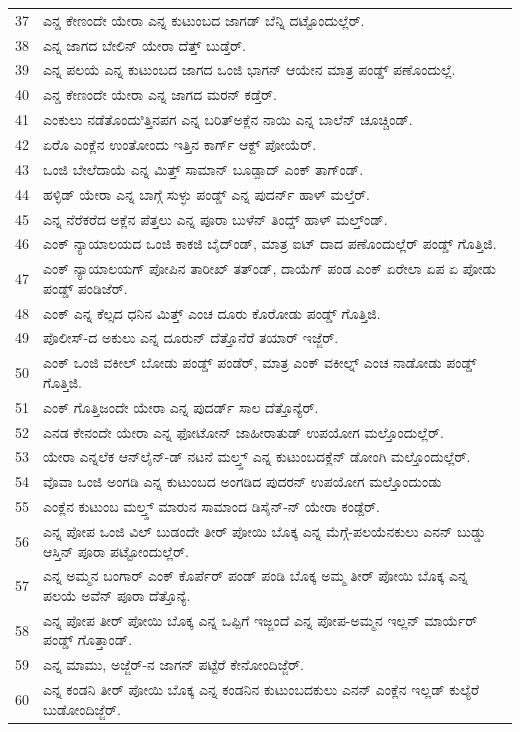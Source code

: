 \documentclass[11pt]{article}
\begin{document}
\begin{longtable}{p{} >{\kannadafont}p{}}
37 & ಎನ್ಡ ಕೇಣಂದೇ ಯೇರಾ ಎನ್ನ ಕುಟುಂಬದ ಜಾಗಡ್ ಬೆನ್ನಿ ದಟ್ಟೊಂದುಲ್ಲೆರ್. \\
38 & ಎನ್ನ ಜಾಗದ ಬೇಲಿನ್ ಯೇರಾ ದೆತ್ತ್ ಬುಡ್ತೆರ್. \\
39 & ಎನ್ನ ಪಲಯೆ ಎನ್ನ ಕುಟುಂಬದ ಜಾಗದ ಒಂಜಿ ಭಾಗನ್ ಆಯೇನ ಮಾತ್ರ ಪಂಡ್ಡ್ ಪಣೊಂದುಲ್ಲೆ. \\
40 & ಎನ್ಡ ಕೇಣಂದೇ ಯೇರಾ ಎನ್ನ ಜಾಗದ ಮರನ್ ಕಡ್ತೆರ್. \\
41 & ಎಂಕುಲು ನಡೆತೊಂದುಿತ್ತಿನಪಗ ಎನ್ನ ಬರಿತ್ಅಕ್ಲೆನ ನಾಯಿ ಎನ್ನ ಬಾಲೆನ್ ಚೂಚ್ಚಿಂಡ್. \\
42 & ಏರೊ ಎಂಕ್ಲೆನ ಉಂತೋಂದು ಇತ್ತಿನ ಕಾರ್ಗ್ ಆಕ್ದ್ ಪೋಯೆರ್. \\
43 & ಒಂಜಿ ಬೇಲೆದಾಯೆ ಎನ್ನ ಮಿತ್ತ್ ಸಾಮಾನ್ ಬೂಡ್ಪಾದ್ ಎಂಕ್ ತಾಗ್ಂಡ್. \\
44 & ಹಳ್ಳಿಡ್ ಯೇರಾ ಎನ್ನ ಬಾಗ್ಗೆ ಸುಳ್ಳು ಪಂಡ್ಡ್ ಎನ್ನ ಪುದರ್ನ್ ಹಾಳ್ ಮಲ್ತೆರ್. \\
45 & ಎನ್ನ ನೆರೆಕರೆದ ಅಕ್ಲೆನ ಪೆತ್ತಲು ಎನ್ನ ಪೂರಾ ಬುಳೆನ್ ತಿಂದ್ಡ್ ಹಾಳ್ ಮಲ್ತ್ಂಡ್. \\
46 & ಎಂಕ್ ನ್ಯಾಯಾಲಯದ ಒಂಜಿ ಕಾಕಜಿ ಬೈದ್ಂಡ್, ಮಾತ್ರ ಐಟ್ ದಾದ ಪಣೊಂದುಲ್ಲೆರ್ ಪಂಡ್ಡ್ ಗೊತ್ತಿಜಿ. \\
47 & ಎಂಕ್ ನ್ಯಾಯಾಲಯಗ್ ಪೋಪಿನ ತಾರೀಖ್ ತತ್ಂಡ್, ದಾಯೆಗ್ ಪಂಡ ಎಂಕ್ ಏರೇಲಾ ಏಪ ಏ ಪೋಡು ಪಂಡ್ಡ್ ಪಂಡಿಜೆರ್. \\
48 & ಎಂಕ್ ಎನ್ನ ಕೆಲ್ಸದ ಧನಿನ ಮಿತ್ತ್ ಎಂಚ ದೂರು ಕೊರೋಡು ಪಂಡ್ಡ್ ಗೊತ್ತಿಜಿ. \\
49 & ಪೊಲೀಸ್-ದ ಅಕುಲು ಎನ್ನ ದೂರುನ್ ದೆತ್ತೊನೆರೆ ತಯಾರ್ ಇಜ್ಜೆರ್. \\
50 & ಎಂಕ್ ಒಂಜಿ ವಕೀಲ್ ಬೋಡು ಪಂಡ್ಡ್ ಪಂಡೆರ್, ಮಾತ್ರ ಎಂಕ್ ವಕೀಲ್ನ್ ಎಂಚ ನಾಡೋಡು ಪಂಡ್ಡ್ ಗೊತ್ತಿಜಿ. \\
51 & ಎಂಕ್ ಗೊತ್ತಿಜಂದೇ ಯೇರಾ ಎನ್ನ ಪುದರ್ಡ್ ಸಾಲ ದೆತ್ತೊನ್ಯೆರ್. \\
52 & ಎನಡ ಕೇನಂದೇ ಯೇರಾ ಎನ್ನ ಫೋಟೋನ್ ಜಾಹೀರಾತುಡ್ ಉಪಯೋಗ ಮಲ್ತೊಂದುಲ್ಲೆರ್. \\
53 & ಯೇರಾ ಎನ್ನಲೆಕ ಆನ್‌ಲೈನ್-ಡ್ ನಟನೆ ಮಲ್ತ್ಡ್ ಎನ್ನ ಕುಟುಂಬದಕ್ಲೆನ್ ಡೋಂಗಿ ಮಲ್ತೊಂದುಲ್ಲೆರ್. \\
54 & ವೊವಾ ಒಂಜಿ ಅಂಗಡಿ ಎನ್ನ ಕುಟುಂಬದ ಅಂಗಡಿದ ಪುದರನ್ ಉಪಯೋಗ ಮಲ್ತೊಂದುಂಡು \\
55 & ಎಂಕ್ಲೆನ ಕುಟುಂಬ ಮಲ್ತ್ಡ್ ಮಾರುನ ಸಾಮಾಂದ ಡಿಸೈನ್-ನ್ ಯೇರಾ ಕಂಡ್ದೆರ್. \\
56 & ಎನ್ನ ಪೋಪ ಒಂಜಿ ವಿಲ್ ಬುಡಂದೇ ತೀರ್ ಪೋಯಿ ಬೊಕ್ಕ ಎನ್ನ ಮೆಗ್ಗೆ-ಪಲಯೆನಕುಲು ಎನನ್ ಬುಡ್ಡು ಆಸ್ತಿನ್ ಪೂರಾ ಪಟ್ಟೋಂದುಲ್ಲೆರ್. \\
57 & ಎನ್ನ ಅಮ್ಮನ ಬಂಗಾರ್ ಎಂಕ್ ಕೊರ್ಪೆರ್ ಪಂಡ್ ಪಂಡಿ ಬೊಕ್ಕ ಅಮ್ಮ ತೀರ್ ಪೋಯಿ ಬೊಕ್ಕ ಎನ್ನ ಪಲಯೆ ಅವೆನ್ ಪೂರಾ ದೆತ್ತೊನ್ಯೆ. \\
58 & ಎನ್ನ ಪೋಪ ತೀರ್ ಪೋಯಿ ಬೊಕ್ಕ ಎನ್ನ ಒಪ್ಪಿಗೆ ಇಜ್ಜಂದೆ ಎನ್ನ ಪೋಪ-ಅಮ್ಮನ ಇಲ್ಲನ್ ಮಾರ್ಯೆರ್ ಪಂಡ್ಡ್ ಗೊತ್ತಾಂಡ್. \\
59 & ಎನ್ನ ಮಾಮು, ಅಜ್ಜೆರ್-ನ ಜಾಗನ್ ಪಟ್ಟೆರೆ ಕೇನೋಂದಿಜ್ಜೆರ್. \\
60 & ಎನ್ನ ಕಂಡನಿ ತೀರ್ ಪೋಯಿ ಬೊಕ್ಕ ಎನ್ನ ಕಂಡನಿನ ಕುಟುಂಬದಕುಲು ಎನನ್ ಎಂಕ್ಲೆನ ಇಲ್ಲಡ್ ಕುಲ್ಯೆರೆ ಬುಡೋಂದಿಜ್ಜೆರ್. \\
\end{longtable}
\end{document}
